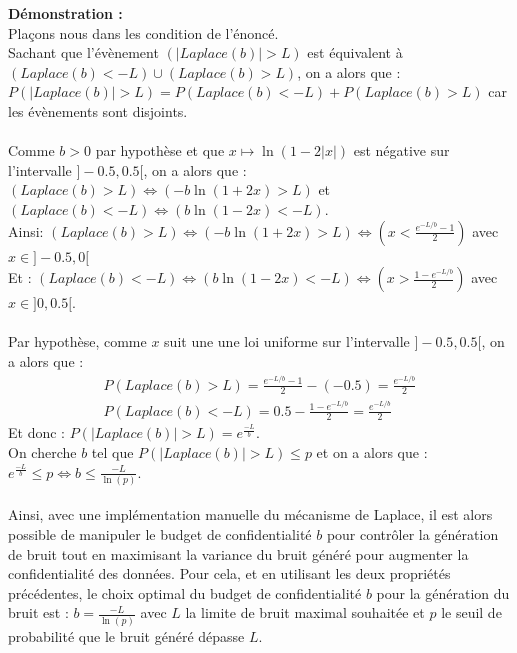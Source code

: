 \documentclass{article}
\begin{document}
\textbf{Démonstration :}\\
Plaçons nous dans les condition de l'énoncé.\\
Sachant que l'évènement $(|Laplace(b)| > L)$ est équivalent à $(Laplace(b)<-L) \cup (Laplace(b)>L)$, on a alors que :
\(P( |Laplace(b)| > L) = P(Laplace(b)<-L) + P(Laplace(b)>L) \) car les évènements sont disjoints.\\
\\
Comme $b>0$ par hypothèse et que $x\mapsto \ln(1 - 2|x|)$ est négative sur l'intervalle $]-0.5, 0.5[$, on a alors que :
\( (Laplace(b)>L) \Leftrightarrow (-b \ln(1+2x)>L)\) et \( (Laplace(b)<-L) \Leftrightarrow (b \ln(1-2x)<-L)\). \\
Ainsi: $ (Laplace(b)>L) \Leftrightarrow ( -b \ln(1+2x)>L) \Leftrightarrow (x < \frac{ e^{-L/b}-1}{2})$ avec $x\in]-0.5,0[$\\
Et : $ (Laplace(b)<-L) \Leftrightarrow ( b \ln(1-2x)<-L) \Leftrightarrow (x > \frac{ 1-e^{-L/b}}{2})$ avec $x\in]0,0.5[$.\\
\\
Par hypothèse, comme $x$ suit une une loi uniforme sur l'intervalle $]-0.5, 0.5[$, on a alors que :
\begin{align*}
    P(Laplace(b)>L) = \frac{ e^{-L/b}-1}{2} - (-0.5) = \frac{ e^{-L/b}}{2} \\
    P(Laplace(b)<-L) = 0.5 - \frac{ 1-e^{-L/b}}{2} = \frac{ e^{-L/b}}{2}
\end{align*}
Et donc : $P( |Laplace(b)| > L) = e^{\frac{-L}{b}}$.\\
On cherche $b$ tel que $P( |Laplace(b)| > L) \leq p$ et on a alors que : $e^{\frac{-L}{b}} \leq p \Leftrightarrow b \leq \frac{-L}{\ln(p)}$.\\
\\
Ainsi, avec une implémentation manuelle du mécanisme de Laplace, il est alors possible de manipuler le budget de confidentialité $b$ pour contrôler
la génération de bruit tout en maximisant la variance du bruit généré pour augmenter la confidentialité des données. Pour cela, et en utilisant les deux propriétés précédentes,
le choix optimal du budget de confidentialité $b$ pour la génération du bruit est : $b = \frac{-L}{\ln(p)}$ avec $L$ la limite de bruit maximal souhaitée et $p$ le seuil de probabilité que le bruit généré dépasse $L$.\\
\end{document}
